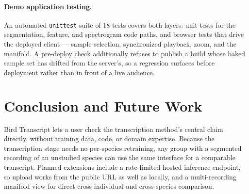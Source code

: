 \documentclass[letterpaper]{article} %
\begin{document}
\paragraph{Demo application testing.} An automated \texttt{unittest} suite of
18 tests covers both layers: unit tests for the segmentation, feature, and
spectrogram code paths, and browser tests that drive the deployed client ---
sample selection, synchronized playback, zoom, and the manifold. A pre-deploy
check additionally refuses to publish a build whose baked sample set has
drifted from the server's, so a regression surfaces before deployment rather
than in front of a live audience.

\section{Conclusion and Future Work}
Bird Transcript lets a user check the transcription method's central
claim directly, without training data, code, or domain expertise. Because
the transcription stage needs no per-species retraining, any group with a
segmented
recording of an unstudied species can use the same interface for a
comparable transcript. Planned extensions include a rate-limited hosted
inference endpoint, so upload works from the public URL as well as locally,
and a multi-recording manifold view for direct cross-individual and
cross-species comparison.


\end{document}
